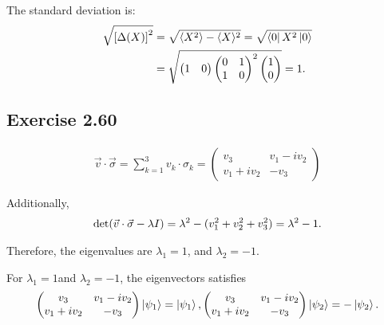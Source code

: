 The standard deviation is:
\begin{align}
\sqrt{\left[\Delta (X)\right]^2} &= \sqrt{\langle X^2\rangle-\langle X\rangle^2}=\sqrt{\bra{0}X^2\ket{0}}\\
&=\sqrt{\begin{pmatrix}
1& 0
\end{pmatrix}
\begin{pmatrix}
0 & 1 \\ 1 & 0
\end{pmatrix}^2
\begin{pmatrix}
1\\0
\end{pmatrix}}=1.
\end{align}

\subsection*{Exercise 2.60}
\begin{align}
\vec v \cdot \vec\sigma=\sum_{k=1}^3 v_k\cdot\sigma_k=\begin{pmatrix}
v_3 & v_1-iv_2\\v_1+iv_2 & -v_3
\end{pmatrix}
\end{align}

Additionally,
\begin{align}
{\rm det}(\vec v\cdot \vec \sigma-\lambda I)=\lambda^2-(v_1^2+v_2^2+v_3^2)=\lambda^2-1.
\end{align}

Therefore, the eigenvalues are $\lambda_1=1$, and $\lambda_2=-1$. 

For $\lambda_1=1$and $\lambda_2=-1$, the eigenvectors satisfies
\begin{align}
\begin{pmatrix}
v_3 & v_1-iv_2\\v_1+iv_2 & -v_3
\end{pmatrix}\ket{\psi_1}=\ket{\psi_1},
\begin{pmatrix}
v_3 & v_1-iv_2\\v_1+iv_2 & -v_3
\end{pmatrix}\ket{\psi_2}=-\ket{\psi_2}.
\end{align}

